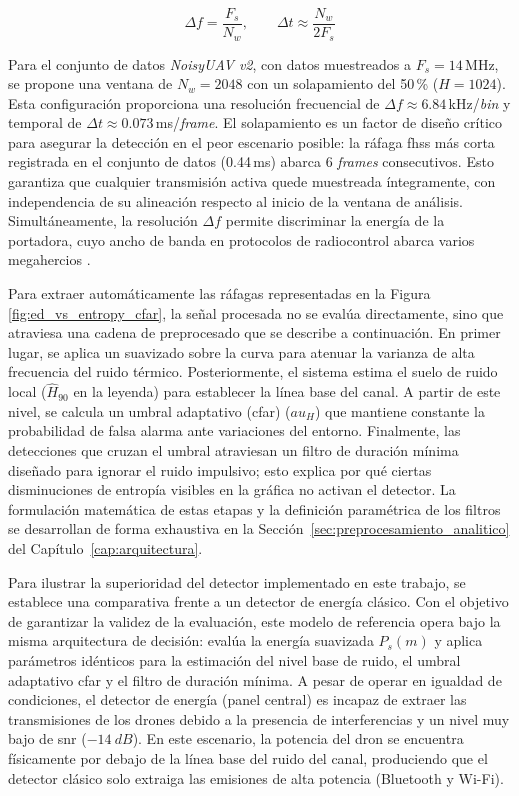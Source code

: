 \begin{equation}
    \Delta f = \frac{F_s}{N_w}, \qquad \Delta t \approx \frac{N_w}{2 F_s}
    \label{eq:resolucion_stft}
\end{equation}

Para el conjunto de datos \textit{NoisyUAV v2}, con datos muestreados a $F_s = 14$\,MHz, se propone una ventana de $N_w = 2048$ con un solapamiento del 50\,\% ($H = 1024$). Esta configuración proporciona una resolución frecuencial de $\Delta f \approx 6.84$\,kHz/\textit{bin} y temporal de $\Delta t \approx 0.073$\,ms/\textit{frame}. El solapamiento es un factor de diseño crítico para asegurar la detección en el peor escenario posible: la ráfaga \gls{fhss} más corta registrada en el conjunto de datos (0.44\,ms) abarca 6 \textit{frames} consecutivos. Esto garantiza que cualquier transmisión activa quede muestreada íntegramente, con independencia de su alineación respecto al inicio de la ventana de análisis. Simultáneamente, la resolución $\Delta f$ permite discriminar la energía de la portadora, cuyo ancho de banda en protocolos de radiocontrol abarca varios megahercios \cite{morge-rollet_drone_2022}.

\vspace{\baselineskip}

Para extraer automáticamente las ráfagas representadas en la Figura \ref{fig:ed_vs_entropy_cfar}, la señal procesada no se evalúa directamente, sino que atraviesa una cadena de preprocesado que se describe a continuación. En primer lugar, se aplica un suavizado sobre la curva para atenuar la varianza de alta frecuencia del ruido térmico. Posteriormente, el sistema estima el suelo de ruido local ($\widehat{H}_{90}$ en la leyenda) para establecer la línea base del canal. A partir de este nivel, se calcula un umbral adaptativo (\gls{cfar}) ($au_H$) que mantiene constante la probabilidad de falsa alarma ante variaciones del entorno. Finalmente, las detecciones que cruzan el umbral atraviesan un filtro de duración mínima diseñado para ignorar el ruido impulsivo; esto explica por qué ciertas disminuciones de entropía visibles en la gráfica no activan el detector. La formulación matemática de estas etapas y la definición paramétrica de los filtros se desarrollan de forma exhaustiva en la Sección~\ref{sec:preprocesamiento_analitico} del Capítulo~\ref{cap:arquitectura}.

Para ilustrar la superioridad del detector implementado en este trabajo, se establece una comparativa frente a un detector de energía clásico. Con el objetivo de garantizar la validez de la evaluación, este modelo de referencia opera bajo la misma arquitectura de decisión: evalúa la energía suavizada $P_s(m)$ y aplica parámetros idénticos para la estimación del nivel base de ruido, el umbral adaptativo \gls{cfar} y el filtro de duración mínima. A pesar de operar en igualdad de condiciones, el detector de energía (panel central) es incapaz de extraer las transmisiones de los drones debido a la presencia de interferencias y un nivel muy bajo de \gls{snr} ($-14~dB$). En este escenario, la potencia del dron se encuentra físicamente por debajo de la línea base del ruido del canal, produciendo que el detector clásico solo extraiga las emisiones de alta potencia (Bluetooth y Wi-Fi).

